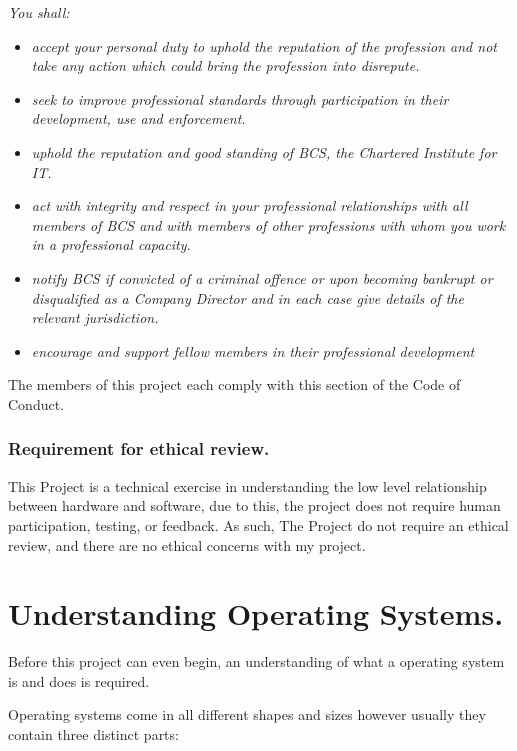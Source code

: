 \documentclass[a4paper]{report}
\begin{document}
\textit{You shall:}
\begin{itemize}
\item \textit{accept your personal duty to uphold the reputation of the profession and not take any action which could bring the profession into disrepute.}
\item \textit{seek to improve professional standards through participation in their development, use and enforcement.}
\item \textit{uphold the reputation and good standing of BCS, the Chartered Institute for IT.}
\item \textit{act with integrity and respect in your professional relationships with all members of BCS and with members of other professions with whom you work in a professional capacity.}
\item \textit{notify BCS if convicted of a criminal offence or upon becoming bankrupt or disqualified as a Company Director and in each case give details of the relevant jurisdiction.}
\item \textit{encourage and support fellow members in their professional development}
\end{itemize}

The members of this project each comply with this section of the Code of Conduct.



\subsection*{Requirement for ethical review.}

This Project is a technical exercise in understanding the low level relationship between hardware and software, due to this, the project does not require human participation, testing, or feedback. As such, The Project do not require an ethical review, and there are no ethical concerns with my project.

\clearpage
\chapter*{Understanding Operating Systems.}


Before this project can even begin, an understanding of what a operating system is and does is required.

Operating systems come in all different shapes and sizes however usually they contain three distinct parts:
\end{document}
